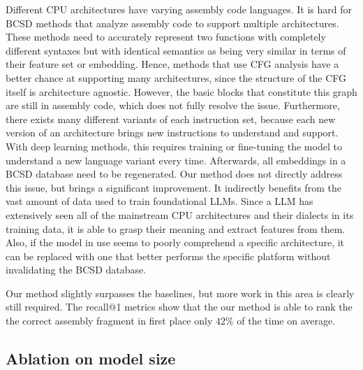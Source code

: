 Different CPU architectures have varying assembly code languages. It is hard for BCSD methods that analyze assembly code to support
multiple architectures. These methods need to accurately represent two functions with completely different syntaxes but with identical
semantics as being very similar in terms of their feature set or embedding. Hence, methods that use CFG analysis have a better chance
at supporting many architectures, since the structure of the CFG itself is architecture agnostic. However, the basic blocks that constitute
this graph are still in assembly code, which does not fully resolve the issue. Furthermore, there exists many different variants of each
instruction set, because each new version of an architecture brings new instructions to understand and support. With deep learning methods,
this requires training or fine-tuning the model to understand a new language variant every time. Afterwards, all embeddings in a BCSD database need to
be regenerated. Our method does not directly address this issue, but brings a significant improvement. It indirectly benefits from the vast
amount of data used to train foundational LLMs. Since a LLM has extensively seen all of the mainstream CPU architectures and their dialects
in its training data, it is able to grasp their meaning and extract features from them. Also, if the model in use seems to poorly comprehend a
specific architecture, it can be replaced with one that better performs the specific platform without invalidating the BCSD database.

Our method slightly surpasses the baselines, but more work in this area is clearly still required. The recall@1 metrics show that the our
method is able to rank the the correct assembly fragment in first place only \(42\%\) of the time on average.

\subsection{Ablation on model size}


